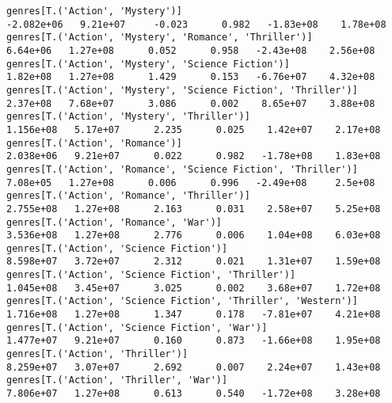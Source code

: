 \documentclass[11pt]{article}
\begin{document}
\begin{Verbatim}[commandchars=\\\{\}]
genres[T.('Action', 'Mystery')]                                                                              -2.082e+06   9.21e+07     -0.023      0.982   -1.83e+08    1.78e+08
genres[T.('Action', 'Mystery', 'Romance', 'Thriller')]                                                         6.64e+06   1.27e+08      0.052      0.958   -2.43e+08    2.56e+08
genres[T.('Action', 'Mystery', 'Science Fiction')]                                                             1.82e+08   1.27e+08      1.429      0.153   -6.76e+07    4.32e+08
genres[T.('Action', 'Mystery', 'Science Fiction', 'Thriller')]                                                 2.37e+08   7.68e+07      3.086      0.002    8.65e+07    3.88e+08
genres[T.('Action', 'Mystery', 'Thriller')]                                                                   1.156e+08   5.17e+07      2.235      0.025    1.42e+07    2.17e+08
genres[T.('Action', 'Romance')]                                                                               2.038e+06   9.21e+07      0.022      0.982   -1.78e+08    1.83e+08
genres[T.('Action', 'Romance', 'Science Fiction', 'Thriller')]                                                 7.08e+05   1.27e+08      0.006      0.996   -2.49e+08     2.5e+08
genres[T.('Action', 'Romance', 'Thriller')]                                                                   2.755e+08   1.27e+08      2.163      0.031    2.58e+07    5.25e+08
genres[T.('Action', 'Romance', 'War')]                                                                        3.536e+08   1.27e+08      2.776      0.006    1.04e+08    6.03e+08
genres[T.('Action', 'Science Fiction')]                                                                       8.598e+07   3.72e+07      2.312      0.021    1.31e+07    1.59e+08
genres[T.('Action', 'Science Fiction', 'Thriller')]                                                           1.045e+08   3.45e+07      3.025      0.002    3.68e+07    1.72e+08
genres[T.('Action', 'Science Fiction', 'Thriller', 'Western')]                                                1.716e+08   1.27e+08      1.347      0.178   -7.81e+07    4.21e+08
genres[T.('Action', 'Science Fiction', 'War')]                                                                1.477e+07   9.21e+07      0.160      0.873   -1.66e+08    1.95e+08
genres[T.('Action', 'Thriller')]                                                                              8.259e+07   3.07e+07      2.692      0.007    2.24e+07    1.43e+08
genres[T.('Action', 'Thriller', 'War')]                                                                       7.806e+07   1.27e+08      0.613      0.540   -1.72e+08    3.28e+08

\end{Verbatim}
\end{document}

